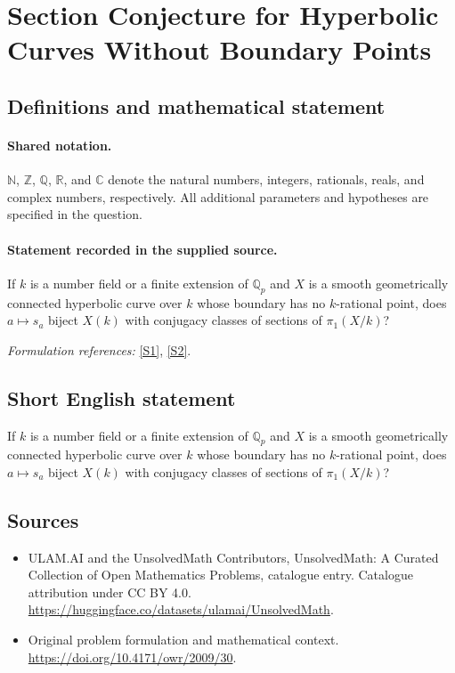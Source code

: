 \documentclass[11pt]{article}
\newcommand{\sref}[2]{\hyperlink{source:#1:#2}{[S#2]}}
\begin{document}
\section{Section Conjecture for Hyperbolic Curves Without Boundary Points}\label{statement}

\subsection{Definitions and mathematical statement}

\paragraph{Shared notation.}$\mathbb N$, $\mathbb Z$, $\mathbb Q$, $\mathbb R$, and $\mathbb C$ denote the natural numbers, integers, rationals, reals, and complex numbers, respectively. All additional parameters and hypotheses are specified in the question.


\paragraph{Statement recorded in the supplied source.}
If $k$ is a number field or a finite extension of $\mathbb{Q}_p$ and $X$ is a smooth geometrically connected hyperbolic curve over $k$ whose boundary has no $k$-rational point, does $a\mapsto s_a$ biject $X(k)$ with conjugacy classes of sections of $\pi_1(X/k)$?
\par\smallskip\textit{Formulation references:} \sref{statement}{1}, \sref{statement}{2}.
\subsection{Short English statement}
If $k$ is a number field or a finite extension of $\mathbb{Q}_p$ and $X$ is a smooth geometrically connected hyperbolic curve over $k$ whose boundary has no $k$-rational point, does $a\mapsto s_a$ biject $X(k)$ with conjugacy classes of sections of $\pi_1(X/k)$?
\subsection{Sources}
\begin{itemize}
\item[\hypertarget{source:statement:1}{S1}] ULAM.AI and the UnsolvedMath Contributors, UnsolvedMath: A Curated Collection of Open Mathematics Problems, catalogue entry. Catalogue attribution under CC BY 4.0.
\url{https://huggingface.co/datasets/ulamai/UnsolvedMath}.
\item[\hypertarget{source:statement:2}{S2}] Original problem formulation and mathematical context.
\url{https://doi.org/10.4171/owr/2009/30}.
\end{itemize}
\label{end:statement}
\end{document}
